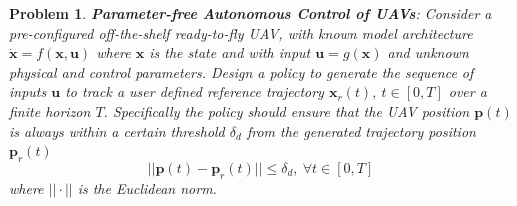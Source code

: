\documentclass[letterpaper, 10 pt, conference]{ieeeconf}  %
\newtheorem{problem}{Problem}
\begin{document}
\begin{problem}
 \textbf{\textit{Parameter-free Autonomous Control of UAVs}}: 
Consider a pre-configured off-the-shelf ready-to-fly UAV, with known model architecture $\dot{\bm{x}}=f(\bm{x},\bm{u})$ where $\bm{x}$ is the state and with input $\bm{u}=g(\bm{x})$ and unknown physical and control parameters. Design a policy to generate the sequence of inputs $\bm{u}$ to track a user defined reference trajectory $\bm{x}_r(t),~ t \in [0,T]$ over a finite horizon $T$. Specifically the policy should ensure that the UAV position $\bm{p}(t)$ is always within a certain threshold $\delta_d$ from the generated trajectory position $\bm{p}_r(t)$
 \begin{equation} \label{eq:positlive}
        ||\bm{p}(t)-\bm{p}_r(t)|| \leq \delta_d,~\forall t \in [0,T]
    \end{equation}
    where $||\cdot||$ is the Euclidean norm.
\end{problem}
%
\end{document}
